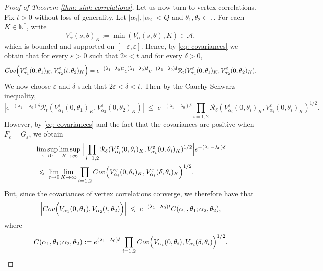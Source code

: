 \documentclass[11pt]{amsart}
\numberwithin{equation}{section}
\theoremstyle{definition}
\renewcommand{\leq}{\;\leqslant\;}                   %
\def\eps{\varepsilon}
\begin{document}
\begin{proof}[Proof of Theorem \ref{thm: sinh correlations}]
Let us now turn to vertex correlations. Fix $t>0$ without loss of generality. Let $|\alpha_1|,|\alpha_2|<Q$ and $\theta_1,\theta_2 \in \mathbb T$. For each $K \in \mathbb N^*$, write
\begin{equation}
V_{\alpha}^\eps(s,\theta)_K:= \min(V_{\alpha}^\eps(s,\theta),K) \in \mathcal A,
\end{equation}
which is bounded and supported on $[-\eps, \eps]$. Hence, by \eqref{eq: covariances} we obtain that for every $\eps > 0$ such that $2\eps < t$ and for every $\delta > 0$,
\begin{equation}
{\rm Cov}\Big(V_{\alpha_1}^\eps(0,\theta_1)_K,  V_{\alpha_2}^\eps(t,\theta_2)_K  \Big) = e^{-(\lambda_1-\lambda_0)t} e^{(\lambda_1-\lambda_0)\delta} e^{-(\lambda_1-\lambda_0)\delta }\mathcal R_t(V_{\alpha_1}^\eps(0,\theta_1)_K,  V_{\alpha_2}^\eps(0,\theta_2)_K).
\end{equation}
We now choose $\eps$ and $\delta$ such that $2\eps < \delta < t$. Then by the Cauchy-Schwarz inequality, 
\begin{equation}
|e^{-(\lambda_1-\lambda_0)\delta }\mathcal R_t(V_{\alpha_1}^\eps(0,\theta_1)_K,  V_{\alpha_2}^\eps(0,\theta_2)_K)| \leq e^{-(\lambda_1-\lambda_0)\delta }\prod_{i=1,2} \mathcal R_\delta( 	V_{\alpha_i}^\eps(0,\theta_i)_K, V_{\alpha_i}^\eps(0,\theta_i)_K)^{1/2}.
\end{equation}
However, by \eqref{eq: covariances} and the fact that the covariances are positive when $F_\eps=G_\eps$, we obtain 
\begin{align*}
& \limsup_{\eps \rightarrow 0}\limsup_{K \rightarrow \infty}\Big|\prod_{i=1,2} \mathcal R_\delta( 	V_{\alpha_i}^\eps(0,\theta_i)_K, V_{\alpha_i}^\eps(0,\theta_i)_K)^{1/2}\Big|e^{-(\lambda_1-\lambda_0)\delta }	\\
& \leq \lim_{\eps \rightarrow 0} \lim_{K \rightarrow \infty} \prod_{i=1,2} {\rm Cov}\Big(V_{\alpha_i}^\eps(0,\theta_i)_K, V_{\alpha_i}^\eps(\delta,\theta_i)_K  \Big)^{1/2}.
\end{align*}
But, since the covariances of vertex correlations converge, we therefore have that
\begin{equation}
\Big|{\rm Cov}\Big(V_{\alpha_1}(0,\theta_1), V_{\alpha_2}(t,\theta_2)\Big)\Big| \leq e^{-(\lambda_1-\lambda_0)t} C(\alpha_1,\theta_1; \alpha_2,\theta_2),	
\end{equation}
where
\begin{equation}
C(\alpha_1,\theta_1;\alpha_2,\theta_2):= e^{(\lambda_1-\lambda_0)\delta} \prod_{i=1,2}{\rm Cov}\Big(V_{\alpha_i}(0,\theta_i), V_{\alpha_i}(\delta,\theta_i) \Big)^{1/2}. 	\qedhere
\end{equation}
\end{proof}
\end{document}
